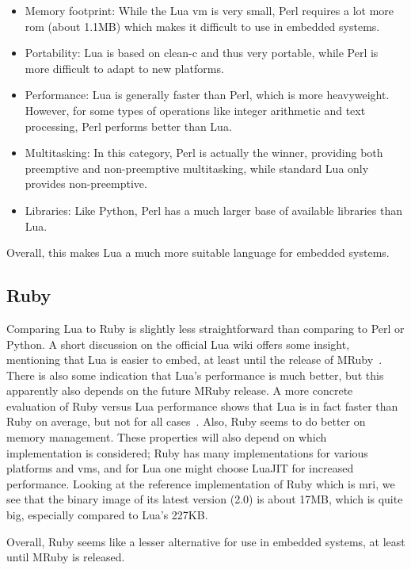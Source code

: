 \begin{itemize}
	\item{Memory footprint:} While the Lua \gls{vm} is very small, Perl requires a lot more \gls{rom} (about 1.1MB) which makes it difficult to use in embedded systems.
	\item{Portability:} Lua is based on \gls{clean-c} and thus very portable, while Perl is more difficult to adapt to new platforms.
	\item{Performance:} Lua is generally faster than Perl, which is more heavyweight. However, for some types of operations like integer arithmetic and text processing, Perl performs better than Lua.
	\item{Multitasking:} In this category, Perl is actually the winner, providing both preemptive and non-preemptive multitasking, while standard Lua only provides non-preemptive.
	\item{Libraries:} Like Python, Perl has a much larger base of available libraries than Lua.
\end{itemize}

Overall, this makes Lua a much more suitable language for embedded systems.

\subsection{Ruby}
\label{sec:lua_vs_ruby}
Comparing Lua to Ruby is slightly less straightforward than comparing to Perl or Python. A short discussion on the official Lua wiki offers some insight, mentioning that Lua is easier to embed, at least until the release of MRuby~\cite{website:lua_wiki_ruby}. There is also some indication that Lua's performance is much better, but this apparently also depends on the future MRuby release. A more concrete evaluation of Ruby versus Lua performance shows that Lua is in fact faster than Ruby on average, but not for all cases~\cite{website:computer_language_benchmarks_game}. Also, Ruby seems to do better on memory management. These properties will also depend on which implementation is considered; Ruby has many implementations for various platforms and \glspl{vm}, and for Lua one might choose LuaJIT for increased performance. Looking at the reference implementation of Ruby which is \gls{mri}, we see that the binary image of its latest version (2.0) is about 17MB, which is quite big, especially compared to Lua's 227KB.

Overall, Ruby seems like a lesser alternative for use in embedded systems, at least until MRuby is released.

